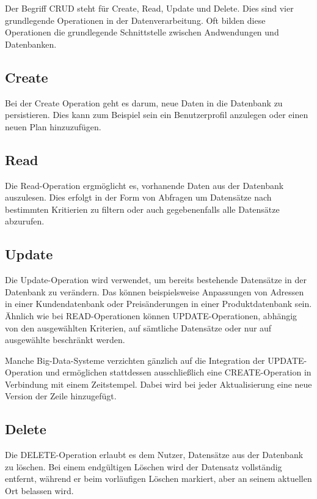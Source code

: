 Der Begriff CRUD steht für Create, Read, Update und Delete. Dies sind vier grundlegende Operationen in der Datenverarbeitung. Oft bilden diese Operationen die grundlegende Schnittstelle zwischen Andwendungen und Datenbanken.


 \subsection{Create}

 Bei der Create Operation geht es darum, neue Daten in die Datenbank zu persistieren. Dies kann zum Beispiel sein ein Benutzerprofil anzulegen oder einen neuen Plan hinzuzufügen. 


 \subsection{Read}

 Die Read-Operation ergmöglicht es, vorhanende Daten aus der Datenbank auszulesen. Dies erfolgt in der Form von Abfragen um Datensätze nach bestimmten Kritierien zu filtern oder auch gegebenenfalls alle Datensätze abzurufen.


\subsection{Update}

Die Update-Operation wird verwendet, um bereits bestehende Datensätze in der Datenbank zu verändern. Das können beispielsweise Anpassungen von Adressen in einer Kundendatenbank oder Preisänderungen in einer Produktdatenbank sein. Ähnlich wie bei READ-Operationen können UPDATE-Operationen, abhängig von den ausgewählten Kriterien, auf sämtliche Datensätze oder nur auf ausgewählte beschränkt werden.

Manche Big-Data-Systeme verzichten gänzlich auf die Integration der UPDATE-Operation und ermöglichen stattdessen ausschließlich eine CREATE-Operation in Verbindung mit einem Zeitstempel. Dabei wird bei jeder Aktualisierung eine neue Version der Zeile hinzugefügt.


\subsection{Delete}


Die DELETE-Operation erlaubt es dem Nutzer, Datensätze aus der Datenbank zu löschen. Bei einem endgültigen Löschen wird der Datensatz vollständig entfernt, während er beim vorläufigen Löschen markiert, aber an seinem aktuellen Ort belassen wird.



